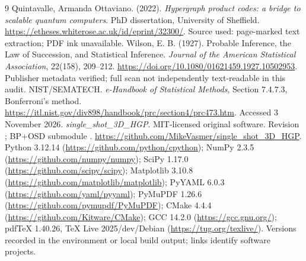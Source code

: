 \begin{thebibliography}{9}
 Quintavalle, Armanda Ottaviano. (2022). \emph{Hypergraph product codes: a bridge to scalable quantum computers}. PhD dissertation, University of Sheffield. \url{https://etheses.whiterose.ac.uk/id/eprint/32300/}. Source used: page-marked text extraction; PDF ink unavailable.
 Wilson, E. B. (1927). Probable Inference, the Law of Succession, and Statistical Inference. \emph{Journal of the American Statistical Association}, 22(158), 209--212. \url{https://doi.org/10.1080/01621459.1927.10502953}. Publisher metadata verified; full scan not independently text-readable in this audit.
 NIST/SEMATECH. \emph{e-Handbook of Statistical Methods}, Section 7.4.7.3, Bonferroni's method. \url{https://itl.nist.gov/div898/handbook/prc/section4/prc473.htm}. Accessed 3 November 2026.
 \emph{single\_shot\_3D\_HGP}. MIT-licensed original software. Revision ; BP+OSD submodule . \url{https://github.com/MikeVasmer/single_shot_3D_HGP}.
 Python 3.12.14 (\url{https://github.com/python/cpython}); NumPy 2.3.5 (\url{https://github.com/numpy/numpy}); SciPy 1.17.0 (\url{https://github.com/scipy/scipy}); Matplotlib 3.10.8 (\url{https://github.com/matplotlib/matplotlib}); PyYAML 6.0.3 (\url{https://github.com/yaml/pyyaml}); PyMuPDF 1.26.6 (\url{https://github.com/pymupdf/PyMuPDF}); CMake 4.4.4 (\url{https://github.com/Kitware/CMake}); GCC 14.2.0 (\url{https://gcc.gnu.org/}); pdfTeX 1.40.26, TeX Live 2025/dev/Debian (\url{https://tug.org/texlive/}). Versions recorded in the environment or local build output; links identify software projects.
\end{thebibliography}
